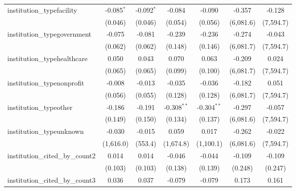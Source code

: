 \begin{tabular}{lcccccc}
   institution\_typefacility             & -0.085$^{*}$   & -0.092$^{*}$   & -0.084        & -0.090        & -0.357       & -0.128\\   
                                         & (0.046)        & (0.046)        & (0.054)       & (0.056)       & (6,081.6)    & (7,594.7)\\   
   institution\_typegovernment           & -0.075         & -0.081         & -0.239        & -0.236        & -0.274       & -0.043\\   
                                         & (0.062)        & (0.062)        & (0.148)       & (0.146)       & (6,081.7)    & (7,594.7)\\   
   institution\_typehealthcare           & 0.050          & 0.043          & 0.070         & 0.063         & -0.209       & 0.024\\   
                                         & (0.065)        & (0.065)        & (0.099)       & (0.100)       & (6,081.7)    & (7,594.7)\\   
   institution\_typenonprofit            & -0.008         & -0.013         & -0.035        & -0.036        & -0.182       & 0.051\\   
                                         & (0.056)        & (0.055)        & (0.128)       & (0.128)       & (6,081.7)    & (7,594.7)\\   
   institution\_typeother                & -0.186         & -0.191         & -0.308$^{**}$ & -0.304$^{**}$ & -0.297       & -0.057\\   
                                         & (0.149)        & (0.150)        & (0.134)       & (0.137)       & (6,081.6)    & (7,594.7)\\   
   institution\_typeunknown              & -0.030         & -0.015         & 0.059         & 0.017         & -0.262       & -0.022\\   
                                         & (1,616.0)      & (553.4)        & (1,674.8)     & (1,100.1)     & (6,081.6)    & (7,594.7)\\   
   institution\_cited\_by\_count2        & 0.014          & 0.014          & -0.046        & -0.044        & -0.109       & -0.109\\   
                                         & (0.103)        & (0.103)        & (0.138)       & (0.139)       & (0.248)      & (0.247)\\   
   institution\_cited\_by\_count3        & 0.036          & 0.037          & -0.079        & -0.079        & 0.173        & 0.161\\   

\end{tabular}
